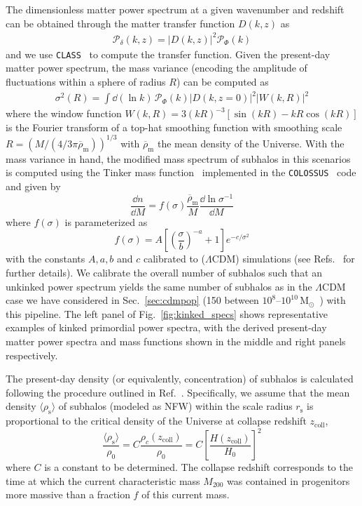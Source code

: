 \documentclass[prd,aps,twocolumn,nofootinbib,superscriptaddress,preprintnumbers,balancelastpage,longbibliography,floatfix]{revtex4-1}
\begin{document}
The dimensionless matter power spectrum at a given wavenumber and redshift can be obtained through the matter transfer function $D(k,z)$ as
\begin{align}
\mathcal{P}_{\delta}(k,z) = \left|D\left(k,z\right)\right|^2 \mathcal{P}_{\Phi}(k) 
\end{align}
and we use \texttt{CLASS}~\cite{Blas:2011rf} to compute the transfer function. Given the present-day matter power spectrum, the mass variance (encoding the amplitude of fluctuations within a sphere of radius $R$) can be computed as 
\begin{align}
\sigma^2(R) = \int \dd (\ln k) \, \mathcal{P}_{\Phi}(k) \left|D\left(k,z=0\right)\right|^2  \left| W(k,R) \right|^2
\end{align}
where  the window function $W(k,R) = 3 (kR)^{-3}[\sin(kR)-kR\cos(kR)]$ is the Fourier transform of a top-hat smoothing function with smoothing scale $R = (M / (4/3\pi\overline{\rho}_\mathrm{m}))^{1/3}$ with $\overline{\rho}_\mathrm{m}$ the mean density of the Universe.
With the mass variance in hand, the modified mass spectrum of subhalos in this scenarios is computed using the Tinker mass function~\cite{Tinker:2008ff} implemented in the \texttt{COLOSSUS}~\cite{Diemer:2017bwl} code and given by
\begin{equation}
\frac{\dd n}{\dd M}=f(\sigma) \frac{\overline{\rho}_\mathrm{m}}{M} \frac{\dd \ln \sigma^{-1}}{\dd M}
\end{equation}
where $f(\sigma)$ is parameterized as
\begin{equation}
f(\sigma)=A\left[\left(\frac{\sigma}{b}\right)^{-a}+1\right] e^{-c / \sigma^{2}}
\end{equation}
with the constants $A, a, b$ and $c$ calibrated to ($\Lambda$CDM) simulations (see Refs.~\cite{Tinker:2008ff,Diemer:2017bwl} for further details). We calibrate the overall number of subhalos such that an unkinked power spectrum yields the same number of subhalos as in the $\Lambda$CDM case we have considered in Sec.~\ref{sec:cdmpop} (150 between $10^8$--$10^{10}$\,M$_\odot$~\cite{Hutten:2016jko}) with this pipeline. The left panel of Fig.~\ref{fig:kinked_specs} shows representative examples of kinked primordial power spectra, with the derived present-day matter power spectra and mass functions shown in the middle and right panels respectively.

The present-day density (or equivalently, concentration) of subhalos is calculated following the procedure outlined in Ref.~\cite{Ludlow:2016ifl}. Specifically, we assume that the mean density $\langle\rho_\mathrm{s}\rangle$ of subhalos (modeled as NFW) within the scale radius $r_\mathrm{s}$ is proportional to the critical density of the Universe at collapse redshift $z_\mathrm{coll}$,
\begin{equation}
\frac{\langle\rho_\mathrm{s}\rangle}{\rho_0} = C\frac{\rho_c(z_\mathrm{coll})}{\rho_0} = C\left[\frac{H(z_\mathrm{coll})}{H_0}\right]^2
\label{eq:rho_s}
\end{equation}
where $C$ is a constant to be determined. The collapse redshift corresponds to the time at which the current characteristic mass $M_{200}$ was contained in progenitors more massive than a fraction $f$ of this current mass.
\end{document}
